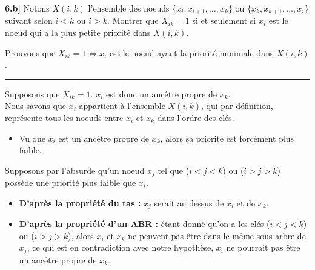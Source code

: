 \documentclass[a4paper,12pt]{report}
\begin{document}

\newpage
{}

\textbf{6.b]} Notons \( X(i,k) \) l'ensemble des noeuds \( \{x_i, x_{i+1}, \dots, x_k \} \) ou \( \{x_k, x_{k+1}, \dots, x_i \} \) suivant selon \(i < k\) 
    ou \( i > k \). Montrer que \( X_{ik} = 1 \) si et seulement si \( x_i \) est le noeud qui a la plus petite priorité dans \( X(i,k) \).



\begin{tcolorbox}[colback=gray!10, colframe=blue!30, coltitle=black, title=Réponse à la 6.b - 1/1]

    Prouvons que \( X_{ik} = 1 \Longleftrightarrow x_i \) est le noeud ayant la priorité minimale dans \( X(i,k) \).

    \vspace{0.5cm}
    \hrule
    \vspace{0.5cm}

    Supposons que \( X_{ik} = 1 \). \( x_i \) est donc un ancêtre propre de \( x_k \).\\

    Nous savons que \( x_i \) appartient à l'ensemble \( X(i,k) \), qui par définition, représente tous les noeuds entre \( x_i \) et \( x_k \) dans
        l'ordre des clés.\\[-0.4cm]
    \begin{itemize}
        \item Vu que \( x_i \) est un ancêtre propre de \( x_k \), alors sa priorité est forcément plus faible.
    \end{itemize}

    \vspace{0.5cm}

    Supposons par l'absurde qu'un noeud \( x_j \) tel que (\( i < j < k \)) ou (\( i > j > k \)) possède une priorité plus faible que \( x_i \).\\[-0.4cm]
    \begin{itemize}
        \item \textbf{D'après la propriété du tas :} \( x_j \) serait au dessus de \( x_i \) et de \( x_k \).
        \item \textbf{D'après la propriété d'un ABR :} étant donné qu'on a les clés (\( i < j < k \)) ou (\( i > j > k \)), alors \( x_i \) et \( x_k \) ne peuvent pas être dans
            le même sous-arbre de \( x_j \), ce qui est en contradiction avec notre hypothèse, \( x_i \) ne pourrait pas être un ancêtre propre de \( x_k \).
    \end{itemize}


\end{tcolorbox}
\end{document}
